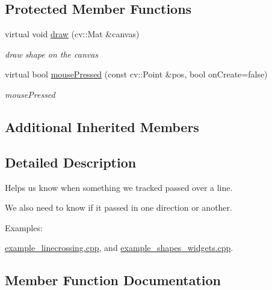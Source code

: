 \subsection*{Protected Member Functions}
\begin{DoxyCompactItemize}
\item 
virtual void \hyperlink{classcanvascv_1_1LineCrossing_a04d251f0cda9f4f51d98d483264fb2dd}{draw} (cv\+::\+Mat \&canvas)
\begin{DoxyCompactList}\small\item\em draw shape on the canvas \end{DoxyCompactList}\item 
virtual bool \hyperlink{classcanvascv_1_1LineCrossing_a8232b4101d5533b12129c4d145ffc54d}{mouse\+Pressed} (const cv\+::\+Point \&pos, bool on\+Create=false)
\begin{DoxyCompactList}\small\item\em mouse\+Pressed \end{DoxyCompactList}\end{DoxyCompactItemize}
\subsection*{Additional Inherited Members}


\subsection{Detailed Description}

\begin{DoxyItemize}
\item Helps us know when something we tracked passed over a line.
\item We also need to know if it passed in one direction or another. 
\end{DoxyItemize}\begin{Desc}
\item[Examples\+: ]\par
\hyperlink{example_linecrossing_8cpp-example}{example\+\_\+linecrossing.\+cpp}, and \hyperlink{example_shapes_widgets_8cpp-example}{example\+\_\+shapes\+\_\+widgets.\+cpp}.\end{Desc}


\subsection{Member Function Documentation}
